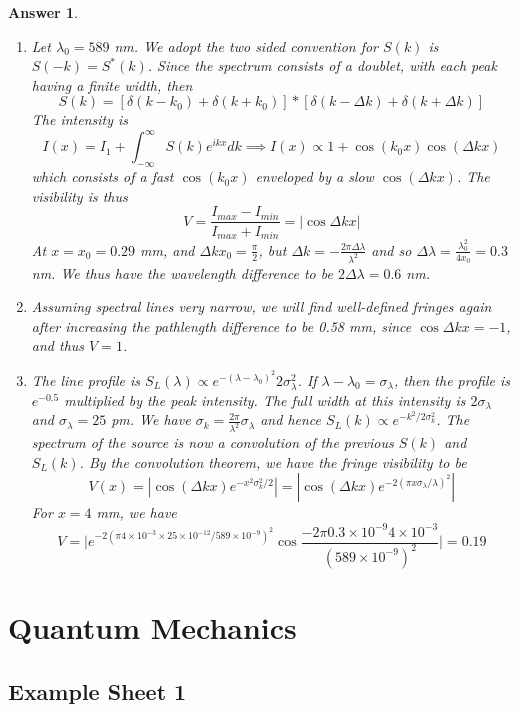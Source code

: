 \documentclass[a4paper]{article}
\newtheorem{ans}{Answer}[section]
\theoremstyle{new}
\begin{document}
\begin{ans}\leavevmode
\begin{enumerate}[label=(\alph*)]
\item Let $\lambda_0=589$ nm. We adopt the two sided convention for $S(k)$ is $S(-k)=S^*(k)$. Since the spectrum consists of a doublet, with each peak having a finite width, then
$$S(k)=[\delta(k-k_0)+\delta(k+k_0)]*[\delta(k-\Delta k)+\delta(k+\Delta k)]$$
The intensity is $$I(x)=I_1+\int_{-\infty}^\infty S(k)e^{ikx}dk\implies I(x)\propto 1+\cos(k_0x)\cos(\Delta kx)$$
which consists of a fast $\cos(k_0x)$ enveloped by a slow $\cos(\Delta kx)$. The visibility is thus
$$V=\frac{I_{max}-I_{min}}{I_{max}+I_{min}}=|\cos\Delta kx|$$
At $x=x_0=0.29$ mm, and $\Delta k x_0=\frac{\pi}{2}$, but $\Delta k=-\frac{2\pi\Delta\lambda}{\lambda^2} $ and so $\Delta\lambda=\frac{\lambda_0^2}{4x_0}=0.3$ nm. We thus have the wavelength difference to be $2\Delta\lambda=0.6$ nm.
\item Assuming spectral lines very narrow, we will find well-defined fringes again after increasing the pathlength difference to be 0.58 mm, since $\cos\Delta kx=-1$, and thus $V=1$.
\item The line profile is $S_L(\lambda)\propto e^{-(\lambda-\lambda_0)^2}{2\sigma_\lambda^2}$. If $\lambda-\lambda_0=\sigma_\lambda$, then the profile is $e^{-0.5}$ multiplied by the peak intensity. The full width at this intensity is $2\sigma_\lambda$ and $\sigma_\lambda=25$ pm. We have $\sigma_k=\frac{2\pi}{\lambda^2}\sigma_\lambda$ and hence $S_L(k)\propto e^{-k^2/2\sigma_k^2}$. The spectrum of the source is now a convolution of the previous $S(k)$ and $S_L(k)$. By the convolution theorem, we have the fringe visibility to be
$$V(x)=|\cos(\Delta k x)e^{-x^2\sigma_k^2/2}|=|\cos(\Delta k x)e^{-2(\pi x\sigma_\lambda/\lambda)^2}|$$
For $x=4$ mm, we have 
$$V=\bigg|e^{-2(\pi4\times10^{-3}\times 25\times10^{-12}/589\times10^{-9})^2}\cos\frac{-2\pi 0.3\times10^{-9}4\times 10^{-3}}{(589\times10^{-9})^2}\bigg|=0.19$$
\end{enumerate}
\end{ans}
\newpage
\section{Quantum Mechanics}
\subsection{Example Sheet 1}
\end{document}
